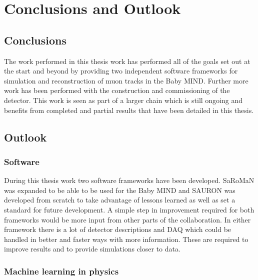 \chapter{Conclusions and Outlook}
\label{c:conclusion}

\section{Conclusions}

The work performed in this thesis work has performed all of the goals set out at the start and beyond by providing two independent software frameworks for simulation and reconstruction of muon tracks in the Baby MIND. Further more work has been performed with the construction and commissioning of the detector. This work is seen as part of a larger chain which is still ongoing and benefits from completed and partial results that have been detailed in this thesis.

\pagebreak
\newpage
\section{Outlook}


\subsection{Software}

During this thesis work two software frameworks have been developed. SaRoMaN was expanded to be able to be used for the Baby MIND and SAURON was developed from scratch to take advantage of lessons learned as well as set a standard for future development. A simple step in improvement required for both frameworks would be more input from other parts of the collaboration. In either framework there is a lot of detector descriptions and DAQ which could be handled in better and faster ways with more information. These are required to improve results and to provide simulations closer to data.


\subsection{Machine learning in physics}

